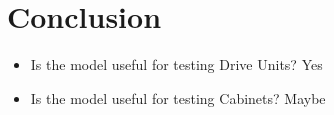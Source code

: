 
\chapter{Conclusion}
\label{chap:conclusion}
\begin{itemize}
	\item Is the model useful for testing Drive Units? Yes
	\item Is the model useful for testing Cabinets? Maybe
\end{itemize}

\FloatBarrier